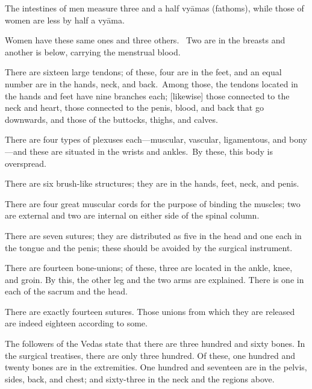 \begin{translation}
\begin{tt}
The intestines of men measure three and a half vyāmas (fathoms), while those of women are less by half a vyāma. 

\item[10]

Women have these same ones and three others. 
Two are in the breasts and another is below, carrying the menstrual blood. 

\item[11]
There are sixteen large tendons; of these, four are in the feet, and an equal number are in the hands, neck, and back. Among those, the tendons located in the hands and feet have nine branches each; [likewise] those connected to the neck and heart, those connected to the penis, blood, and back that go downwards, and those of the buttocks, thighs, and calves. 

\item[12]
There are four types of plexuses each—muscular, vascular, ligamentous, and bony—and these are situated in the wrists and ankles. By these, this body is overspread. 

\item[13]
There are six brush-like structures; they are in the hands, feet, neck, and penis. 

\item[14]
There are four great muscular cords for the purpose of binding the muscles; two are external and two are internal on either side of the spinal column. 

\item[15]
There are seven sutures; they are distributed as five in the head and one each in the tongue and the penis; these should be avoided by the surgical instrument. 

\item[16]
There are fourteen bone-unions; of these, three are located in the ankle, knee, and groin.
By this, the other leg and the two arms are explained. 
There is one in each of the sacrum and the head. 

\item[17]
There are exactly fourteen sutures. 
Those unions from which they are released are indeed eighteen according to some. 

\item[18]
The followers of the Vedas state that there are three hundred and sixty bones. In the surgical treatises, there are only three hundred. Of these, one hundred and twenty bones are in the extremities.  One hundred and seventeen are in the pelvis, sides, back, and chest; and sixty-three in the neck and the regions above. 


\end{tt}
\end{translation}
